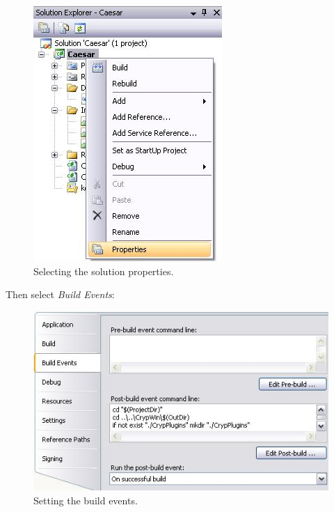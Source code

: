 \begin{figure}[h]
	\centering
		\includegraphics{figures/solution_properties.JPG}
	\caption{Selecting the solution properties.}
	\label{fig:solution_properties}
\end{figure}
\clearpage

\noindent Then select \textit{Build Events}:

\begin{figure}[h]
	\centering
		\includegraphics{figures/post_build.JPG}
	\caption{Setting the build events.}
	\label{fig:post_build}
\end{figure}

